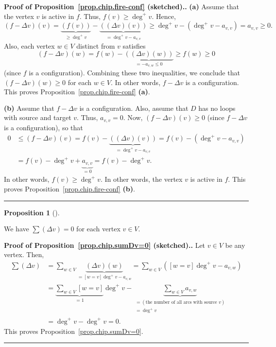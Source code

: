 \documentclass[numbers=enddot,12pt,final,onecolumn,notitlepage]{scrartcl}%
\theoremstyle{definition}
\newtheorem{prop}[theo]{Proposition}
\newenvironment{proposition}[1][]
{\begin{prop}[#1]\begin{leftbar}}
{\end{leftbar}\end{prop}}
\newenvironment{proof}[1][Proof]{\noindent\textbf{#1.} }{\ \rule{0.5em}{0.5em}}
\let\sumnonlimits\sum
\renewcommand{\sum}{\sumnonlimits\limits}
\newcommand{\tup}[1]{\left( #1 \right)}
\begin{document}
\begin{proof}[Proof of Proposition~\ref{prop.chip.fire-conf} (sketched).]
\textbf{(a)} Assume that the vertex $v$ is active in $f$.
Thus, $f \tup{v} \geq \deg^+ v$.
Hence,
\[
\tup{f - \Delta v} \tup{v}
= \underbrace{\tup{ f \tup{v} }}_{\geq \deg^+ v}
  - \underbrace{\tup{ \tup{\Delta v} \tup{v} }}_{= \deg^+ v - a_{v, v} }
\geq \deg^+ v - \tup{\deg^+ v - a_{v, v}} = a_{v, v} \geq 0 .
\]
Also, each vertex $w \in V$ distinct from $v$ satisfies
\[
\tup{f - \Delta v} \tup{w}
= f \tup{w}
  - \underbrace{\tup{ \tup{\Delta v} \tup{w} }}_{= - a_{v, w} \leq 0 }
\geq f \tup{w} \geq 0
\]
(since $f$ is a configuration).
Combining these two inequalities, we conclude that
$\tup{f - \Delta v} \tup{w} \geq 0$
for each $w \in V$.
In other words, $f - \Delta v$ is a configuration.
This proves Proposition~\ref{prop.chip.fire-conf} \textbf{(a)}.

\textbf{(b)} Assume that $f - \Delta v$ is a configuration.
Also, assume that $D$ has no loops with source and target $v$.
Thus, $a_{v, v} = 0$.
Now, $\tup{f - \Delta v} \tup{v} \geq 0$ (since
$f - \Delta v$ is a configuration), so that
\begin{align*}
0 &\leq \tup{f - \Delta v} \tup{v}
= f \tup{v}
  - \underbrace{\tup{ \tup{\Delta v} \tup{v} }}_{= \deg^+ v - a_{v, v} }
= f \tup{v} - \tup{\deg^+ v - a_{v, v}} \\
&= f \tup{v} - \deg^+ v + \underbrace{a_{v, v}}_{= 0}
= f \tup{v} - \deg^+ v .
\end{align*}
In other words, $f \tup{v} \geq \deg^+ v$. In other words,
the vertex $v$ is active in $f$.
This proves Proposition~\ref{prop.chip.fire-conf} \textbf{(b)}.
\end{proof}

\begin{proposition} \label{prop.chip.sumDv=0}
We have $\sum \tup{\Delta v} = 0$ for each vertex $v \in V$.
\end{proposition}

\begin{proof}[Proof of Proposition~\ref{prop.chip.sumDv=0} (sketched).]
Let $v\in V$ be any vertex. Then,
\begin{align*}
\sum\left(  \Delta v\right)    & =\sum_{w\in V}\underbrace{\left(  \Delta
v\right)  \left(  w\right)  }_{=\left[  w=v\right]  \deg^{+}v-a_{v,w}}%
=\sum_{w\in V}\left(  \left[  w=v\right]  \deg^{+}v-a_{v,w}\right)  \\
& =\underbrace{\sum_{w\in V}\left[  w=v\right]  }_{=1}\deg^{+}%
v-\underbrace{\sum_{w\in V}a_{v,w}}_{\substack{=\left(  \text{the number of
all arcs with source }v\right)  \\=\deg^{+}v}}\\
& =\deg^{+}v-\deg^{+}v=0.
\end{align*}
This proves Proposition~\ref{prop.chip.sumDv=0}.
\end{proof}
\end{document}
